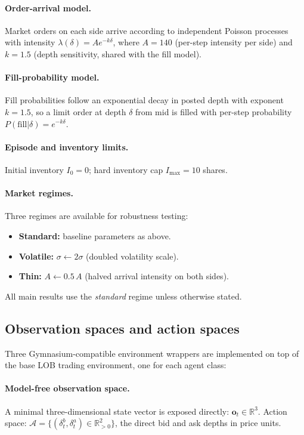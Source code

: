 \documentclass[11pt]{article}
\begin{document}
\paragraph{Order-arrival model.}
Market orders on each side arrive according to independent Poisson
processes with intensity $\lambda(\delta) = A e^{-k\delta}$, where
$A = 140$ (per-step intensity per side) and $k = 1.5$ (depth
sensitivity, shared with the fill model).

\paragraph{Fill-probability model.}
Fill probabilities follow an exponential decay in posted depth with exponent $k = 1.5$, so a
limit order at depth $\delta$ from mid is filled with per-step
probability $P(\text{fill}|\delta) = e^{-k\delta}$.

\paragraph{Episode and inventory limits.}
Initial inventory $I_0 = 0$; hard inventory cap $I_{\max} = 10$ shares.

\paragraph{Market regimes.}
Three regimes are available for robustness testing:
\begin{itemize}[leftmargin=*, itemsep=2pt]
  \item \textbf{Standard:} baseline parameters as above.
  \item \textbf{Volatile:} $\sigma \leftarrow 2\sigma$ (doubled
    volatility scale).
  \item \textbf{Thin:} $A \leftarrow 0.5\, A$ (halved arrival
    intensity on both sides).
\end{itemize}
All main results use the \textit{standard} regime unless otherwise stated.

\subsection{Observation spaces and action spaces}

Three Gymnasium-compatible environment wrappers are implemented on top of
the base LOB trading environment, one for each agent class:

\paragraph{Model-free observation space.}
A minimal three-dimensional state vector is exposed directly:
$\mathbf{o}_t \in \mathbb{R}^3$.
Action space: $\mathcal{A} = \{(\delta^b_t, \delta^a_t) \in \mathbb{R}^2_{>0}\}$,
the direct bid and ask depths in price units.
\end{document}
